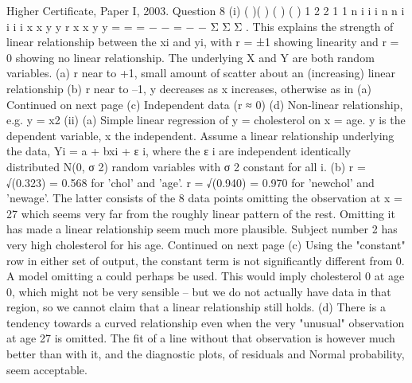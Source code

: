 \documentclass[a4paper,12pt]{article}
\begin{document}
Higher Certificate, Paper I, 2003. Question 8
(i)
( )( )
( ) ( )
1
2 2
1 1
n
i i
i
n n
i i
i i
x x y y
r
x x y y
=
= =
− −
=
− −
Σ
Σ Σ
.
This explains the strength of linear relationship between the xi and yi, with
r = ±1 showing linearity and r = 0 showing no linear relationship. The
underlying X and Y are both random variables.
(a) r near to +1, small amount of scatter about an (increasing) linear
relationship
(b) r near to –1, y decreases as x increases, otherwise as in (a)
Continued on next page
(c) Independent data (r ≈ 0)
(d) Non-linear relationship, e.g. y = x2
(ii) (a) Simple linear regression of y = cholesterol on x = age. y is the
dependent variable, x the independent. Assume a linear relationship
underlying the data, Yi = a + bxi + ε
i, where the { ε
i} are independent
identically distributed N(0, σ 2) random variables with σ 2 constant for
all i.
(b) r = √(0.323) = 0.568 for 'chol' and 'age'.
r = √(0.940) = 0.970 for 'newchol' and 'newage'.
The latter consists of the 8 data points omitting the observation at
x = 27 which seems very far from the roughly linear pattern of the rest.
Omitting it has made a linear relationship seem much more plausible.
Subject number 2 has very high cholesterol for his age.
Continued on next page
(c) Using the "constant" row in either set of output, the constant term is
not significantly different from 0. A model omitting a could perhaps
be used.
This would imply cholesterol 0 at age 0, which might not be very
sensible – but we do not actually have data in that region, so we
cannot claim that a linear relationship still holds.
(d) There is a tendency towards a curved relationship even when the very
"unusual" observation at age 27 is omitted. The fit of a line without
that observation is however much better than with it, and the
diagnostic plots, of residuals and Normal probability, seem acceptable.
\end{document}
